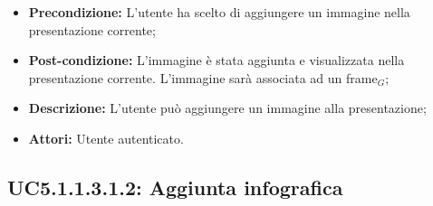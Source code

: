\begin{itemize}
	\item \textbf{Precondizione:} L'utente ha scelto di aggiungere un immagine nella presentazione corrente;
	\item \textbf{Post-condizione:} L'immagine è stata aggiunta e visualizzata nella presentazione corrente. L'immagine sarà associata ad un frame$_G$;
	\item \textbf{Descrizione:} L'utente può aggiungere un immagine alla presentazione;
	\item \textbf{Attori:} Utente autenticato.
\end{itemize}
\subsection{ UC5.1.1.3.1.2: Aggiunta infografica}


